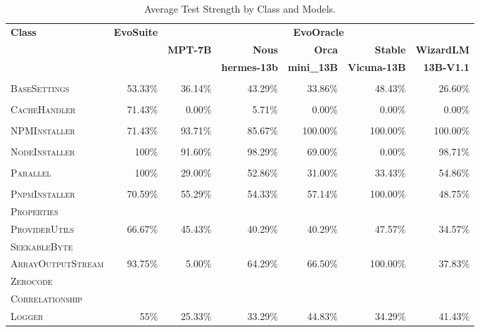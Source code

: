 \begin{table}[H]
\centering

\begin{tabular}{| l | r | r | r | r | r | r |}
\hline
\multirow{2}{*}{\textbf{Class}} & \multirow{2}{*}{\textbf{EvoSuite}} & \multicolumn{5}{c|}{\textbf{EvoOracle}} \\ %
\cline{3-7} %
 &  & \textbf{MPT-7B} & \textbf{Nous} & \textbf{Orca} & \textbf{Stable} & \textbf{WizardLM} \\
 &  &  & \textbf{hermes-13b} & \textbf{mini\_13B} & \textbf{Vicuna-13B} & \textbf{13B-V1.1} \\
\hline
\scriptsize\textsc{} &  &  &  &  &  &  \\
\scriptsize\textsc{BaseSettings} & 53.33\% & 36.14\% & 43.29\% & 33.86\% & 48.43\% & 26.60\% \\
\hline
\scriptsize\textsc{} &  &  &  &  &  &  \\
\scriptsize\textsc{CacheHandler} & 71.43\% & 0.00\% & 5.71\% & 0.00\% & 0.00\% & 0.00\% \\
\hline
\scriptsize\textsc{} &  &  &  &  &  &  \\
\scriptsize\textsc{NPMInstaller} & 71.43\% & 93.71\% & 85.67\% & 100.00\% & 100.00\% & 100.00\% \\
\hline
\scriptsize\textsc{} &  &  &  &  &  &  \\
\scriptsize\textsc{NodeInstaller} & 100\% & 91.60\% & 98.29\% & 69.00\% & 0.00\% & 98.71\% \\
\hline
\scriptsize\textsc{} &  &  &  &  &  &  \\
\scriptsize\textsc{Parallel} & 100\% & 29.00\% & 52.86\% & 31.00\% & 33.43\% & 54.86\% \\
\hline
\scriptsize\textsc{} &  &  &  &  &  &  \\
\scriptsize\textsc{PnpmInstaller} & 70.59\% & 55.29\% & 54.33\% & 57.14\% & 100.00\% & 48.75\% \\
\hline
\scriptsize\textsc{Properties} &  &  &  &  &  &  \\
\scriptsize\textsc{ProviderUtils} & 66.67\% & 45.43\% & 40.29\% & 40.29\% & 47.57\% & 34.57\% \\
\hline
\scriptsize\textsc{SeekableByte} &  &  &  &  &  &  \\
\scriptsize\textsc{ArrayOutputStream} & 93.75\% & 5.00\% & 64.29\% & 66.50\% & 100.00\% & 37.83\% \\
\hline
\scriptsize\textsc{Zerocode} &  &  &  &  &  &  \\
\scriptsize\textsc{Correlationship} &  &  &  &  &  &  \\
\scriptsize\textsc{Logger} & 55\% & 25.33\% & 33.29\% & 44.83\% & 34.29\% & 41.43\% \\
\hline

\end{tabular}
\caption{Average Test Strength by Class and Models.}
\label{tab:test_strength}
\end{table}

